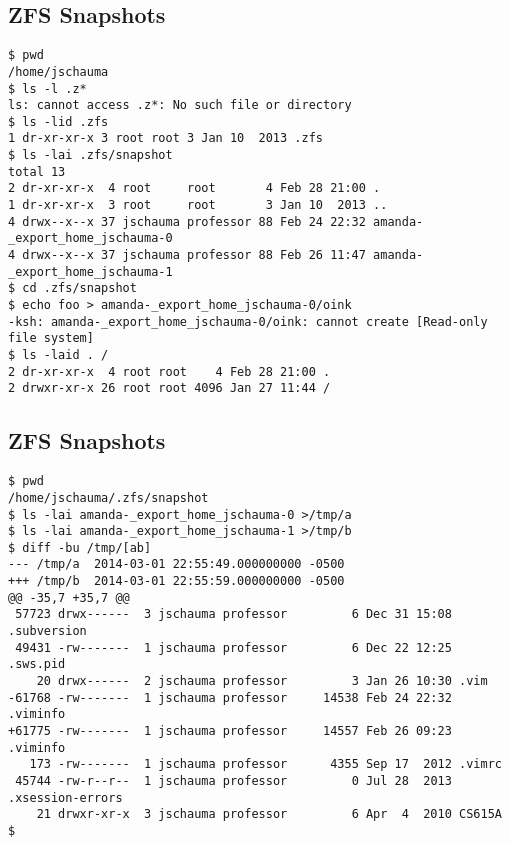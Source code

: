 \documentclass[xga]{xdvislides}
\begin{document}
\subsection{ZFS Snapshots}
\smallish
\begin{verbatim}
$ pwd
/home/jschauma
$ ls -l .z*
ls: cannot access .z*: No such file or directory
$ ls -lid .zfs
1 dr-xr-xr-x 3 root root 3 Jan 10  2013 .zfs
$ ls -lai .zfs/snapshot
total 13
2 dr-xr-xr-x  4 root     root       4 Feb 28 21:00 .
1 dr-xr-xr-x  3 root     root       3 Jan 10  2013 ..
4 drwx--x--x 37 jschauma professor 88 Feb 24 22:32 amanda-_export_home_jschauma-0
4 drwx--x--x 37 jschauma professor 88 Feb 26 11:47 amanda-_export_home_jschauma-1
$ cd .zfs/snapshot
$ echo foo > amanda-_export_home_jschauma-0/oink
-ksh: amanda-_export_home_jschauma-0/oink: cannot create [Read-only file system]
$ ls -laid . /
2 dr-xr-xr-x  4 root root    4 Feb 28 21:00 .
2 drwxr-xr-x 26 root root 4096 Jan 27 11:44 /
\end{verbatim}
\Normalsize

\subsection{ZFS Snapshots}
\smallish
\begin{verbatim}
$ pwd
/home/jschauma/.zfs/snapshot
$ ls -lai amanda-_export_home_jschauma-0 >/tmp/a
$ ls -lai amanda-_export_home_jschauma-1 >/tmp/b
$ diff -bu /tmp/[ab]
--- /tmp/a	2014-03-01 22:55:49.000000000 -0500
+++ /tmp/b	2014-03-01 22:55:59.000000000 -0500
@@ -35,7 +35,7 @@
 57723 drwx------  3 jschauma professor         6 Dec 31 15:08 .subversion
 49431 -rw-------  1 jschauma professor         6 Dec 22 12:25 .sws.pid
    20 drwx------  2 jschauma professor         3 Jan 26 10:30 .vim
-61768 -rw-------  1 jschauma professor     14538 Feb 24 22:32 .viminfo
+61775 -rw-------  1 jschauma professor     14557 Feb 26 09:23 .viminfo
   173 -rw-------  1 jschauma professor      4355 Sep 17  2012 .vimrc
 45744 -rw-r--r--  1 jschauma professor         0 Jul 28  2013 .xsession-errors
    21 drwxr-xr-x  3 jschauma professor         6 Apr  4  2010 CS615A
$
\end{verbatim}
\Normalsize
\end{document}
